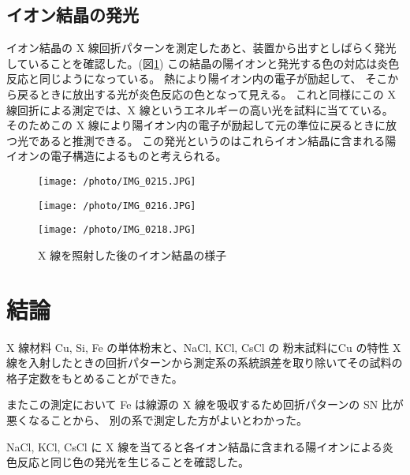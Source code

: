 \documentclass[11pt,dvipdfmx,a4paper]{jsarticle}
\begin{document}
\subsection{イオン結晶の発光}
イオン結晶の X 線回折パターンを測定したあと、装置から出すとしばらく発光していることを確認した。(図\ref{photo:ion})
この結晶の陽イオンと発光する色の対応は炎色反応と同じようになっている。
熱により陽イオン内の電子が励起して、
そこから戻るときに放出する光が炎色反応の色となって見える。
これと同様にこの X 線回折による測定では、X 線というエネルギーの高い光を試料に当てている。
そのためこの X 線により陽イオン内の電子が励起して元の準位に戻るときに放つ光であると推測できる。
この発光というのはこれらイオン結晶に含まれる陽イオンの電子構造によるものと考えられる。
\begin{figure}[H]
	\begin{minipage}[t]{0.3\columnwidth}
		\centering
		\texttt{[image: /photo/IMG\_0215.JPG]}
	\end{minipage}
	\hfill
	\begin{minipage}[t]{0.3\columnwidth}
		\centering
		\texttt{[image: /photo/IMG\_0216.JPG]}
	\end{minipage}
	\hfill
	\begin{minipage}[t]{0.3\columnwidth}
		\centering
		\texttt{[image: /photo/IMG\_0218.JPG]}
	\end{minipage}
	\caption{X 線を照射した後のイオン結晶の様子}
	\label{photo:ion}
\end{figure}


\section{結論}
X 線材料 Cu, Si, Fe の単体粉末と、NaCl, KCl, CsCl の
粉末試料にCu の特性 X 線を入射したときの回折パターンから測定系の系統誤差を取り除いてその試料の格子定数をもとめることができた。

またこの測定において Fe は線源の X 線を吸収するため回折パターンの SN 比が悪くなることから、
別の系で測定した方がよいとわかった。

NaCl, KCl, CsCl に X 線を当てると各イオン結晶に含まれる陽イオンによる炎色反応と同じ色の発光を生じることを確認した。



\end{document}
